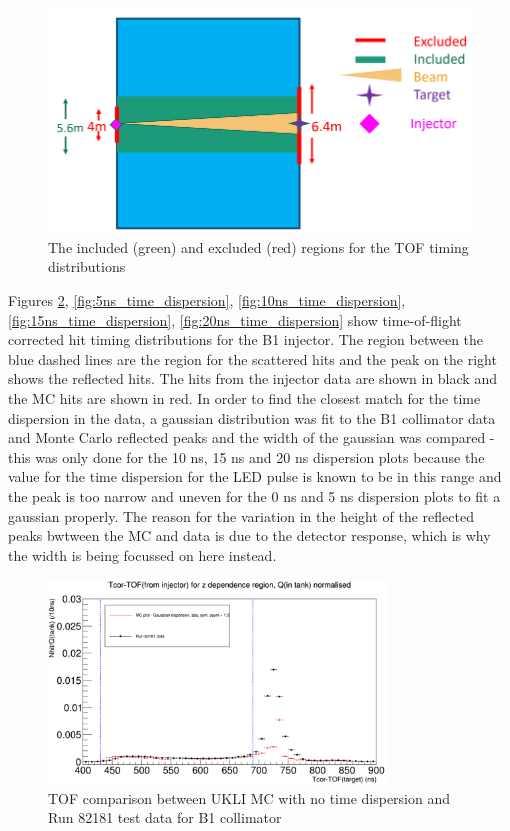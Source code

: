 \begin{figure}
    \centering
    \includegraphics[width=\textwidth]{Figures/exclusion_region.PNG}
    \caption{The included (green) and excluded (red) regions for the TOF timing distributions}
    \label{fig:exclusion_region}
\end{figure}

Figures \ref{fig:0ns_time_dispersion}, \ref{fig:5ns_time_dispersion}, \ref{fig:10ns_time_dispersion}, \ref{fig:15ns_time_dispersion}, \ref{fig:20ns_time_dispersion} show time-of-flight corrected hit timing distributions for the B1 injector. The region between the blue dashed lines are the region for the scattered hits and the peak on the right shows the reflected hits. The hits from the injector data are shown in black and the MC hits are shown in red. In order to find the closest match for the time dispersion in the data, a gaussian distribution was fit to the B1 collimator data and Monte Carlo reflected peaks and the width of the gaussian was compared - this was only done for the 10 ns, 15 ns and 20 ns dispersion plots because the value for the time dispersion for the LED pulse is known to be in this range and the peak is too narrow and uneven for the 0 ns and 5 ns dispersion plots to fit a gaussian properly. The reason for the variation in the height of the reflected peaks bwtween the MC and data is due to the detector response, which is why the width is being focussed on here instead.

\begin{figure}
    \centering
    \includegraphics[width=0.8\textwidth]{Figures/0ns_gaussian_dispersion_comparison.PNG}
    \caption{TOF comparison between UKLI MC with no time dispersion and Run 82181 test data for B1 collimator}
    \label{fig:0ns_time_dispersion}
\end{figure}

